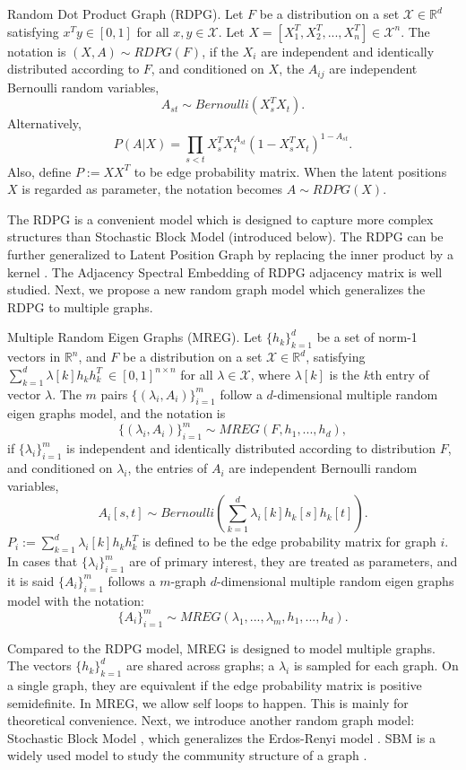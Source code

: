 \documentclass[10pt,journal,compsoc]{IEEEtran}
\newenvironment{definition}[1][Definition]{\begin{trivlist}
		\item[\hskip \labelsep {\bfseries #1}]}{\end{trivlist}}
\begin{document}
\begin{definition} Random Dot Product Graph (RDPG). Let $F$ be a distribution on a set $\mathcal{X} \in \mathbb{R}^d$ satisfying $x^T y \in [0, 1]$ for all $x, y \in \mathcal{X}$. Let $X=[X_1^T,X_2^T,...,X_n^T] \in \mathcal{X}^n$. The notation is $(X,A) \sim RDPG(F)$, if the $X_i$ are independent and identically distributed according to $F$, and conditioned on $X$, the $A_{ij}$ are independent Bernoulli random variables,
	\[ A_{st} \sim Bernoulli(X_s^T X_t). \]
	Alternatively,
	\[ P(A|X) = \prod_{s<t} X_s^T X_t ^{ A_{st}} (1-X_s^T X_t)^{1- A_{st}}.\]
	Also, define $P:=XX^T$ to be edge probability matrix. When the latent positions $X$ is regarded as parameter, the notation becomes $A \sim RDPG(X)$.
\end{definition}
The RDPG is a convenient model which is designed to capture more complex structures than Stochastic Block Model (introduced below). The RDPG can be further generalized to Latent Position Graph by replacing the inner product by a kernel \cite{tang2013universally}. The Adjacency Spectral Embedding of RDPG adjacency matrix is well studied\cite{sussman2014consistent}. Next, we propose a new random graph model which generalizes the RDPG to multiple graphs.

\begin{definition} Multiple Random Eigen Graphs (MREG). Let $\{h_k\}_{k=1}^{d}$ be a set of norm-1 vectors in $\mathbb{R}^{n}$, and  $F$ be a distribution on a set $\mathcal{X} \in \mathbb{R}^d$,  satisfying $\sum\limits_{k=1}^{d} \lambda [k] h_k  h_k^T \  \in [0, 1]^{n \times n} $ for all $\lambda \in \mathcal{X}$, where $\lambda[k]$ is the $k$th entry of vector $\lambda$. The $m$ pairs $\{(\lambda_i, A_i)\}_{i=1}^m$ follow a $d$-dimensional multiple random eigen graphs model, and the notation is
	\[\{(\lambda_i,A_i)\}_{i=1}^m \sim MREG(F,h_1,...,h_d),\]
	if $\{\lambda_i\}_{i=1}^m$ is independent and identically distributed according to distribution $F$, and conditioned on $\lambda_i$, the entries of $A_i$ are independent Bernoulli random variables,
	\[ A_{i}[s,t] \sim Bernoulli( \sum_{k=1}^{d} \lambda_{i}[k] h_{k} [s] h_{k} [t] ). \]
	$P_i:=\sum_{k=1}^{d} \lambda_i [k] h_k  h_k^T$ is defined to be the edge probability matrix for graph $i$. In cases that $\{\lambda_i\}_{i=1}^m$ are of primary interest, they are treated as parameters, and it is said $\{A_i\}_{i=1}^{m}$ follows a $m$-graph $d$-dimensional multiple random eigen graphs model with the notation:
	\[\{A_i\}_{i=1}^{m} \sim MREG(\lambda_1,...,\lambda_m,h_1,...,h_d).\] 
\end{definition}
Compared to the RDPG model, MREG is designed to model multiple graphs. The vectors $\{h_k\}_{k=1}^{d}$ are shared across graphs; a  $\lambda_i$ is sampled for each graph. On a single graph, they are equivalent if the edge probability matrix is positive semidefinite. In MREG, we allow self loops to happen. This is mainly for theoretical convenience. Next, we introduce another random graph model: Stochastic Block Model \cite{holland1983stochastic}, which generalizes the Erdos-Renyi model \cite{erdds1959random}. SBM is a widely used model to study the community structure of a  graph \cite{karrer2011stochastic, lyzinski2015community}.\\
\end{document}

